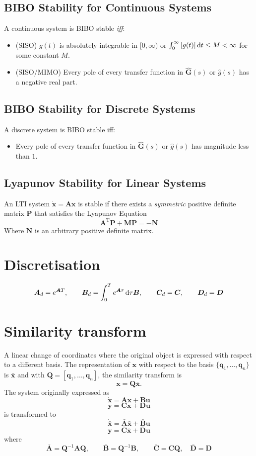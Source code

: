 \documentclass[a4paper]{article}
\newcommand{\M}[1]{\bm{#1}}
\newcommand{\V}[1]{\mathbf{#1}}
\newcommand{\transpose}{^{\text{T}}}
\begin{document}
\subsection{BIBO Stability for Continuous Systems}
A continuous system is BIBO stable \emph{iff}:
\begin{itemize}
\item	(SISO) $g(t)$ is absolutely integrable in $[0, \infty)$ \quad or \quad $\int_{0}^{\infty} |g(t)| \dif t \leq M < \infty $ for some constant $M$.
\item	(SISO/MIMO) Every pole of every transfer function in $\M{\hat{G}}(s)$ or $\hat{g}(s)$ has a negative real part.
\end{itemize}
\subsection{BIBO Stability for Discrete Systems}
A discrete system is BIBO stable iff:
\begin{itemize}
\item	Every pole of every transfer function in $\M{\hat{G}}(s)$ or $\hat{g}(s)$ has magnitude less than $1$.
\end{itemize}
\subsection{Lyapunov Stability for Linear Systems}
An LTI system $\V{\dot{x}} = \M{A}\V{x}$ is stable if there exists a \emph{symmetric} positive definite matrix $\M{P}$ that satisfies the Lyapunov Equation
$$\M{A} \transpose \M{P} + \M{MP} = - \M{N}$$
Where $\M{N}$ is an arbitrary positive definite matrix.



\section{Discretisation}
$$\M{A}_d = e^{\M{A}T},\qquad \M{B}_d = \int_0^T e^{\M{A}\tau} \dif \tau \M{B}, \qquad \M{C}_d = \M{C}, \qquad \M{D}_d = \M{D}$$



\section{Similarity transform}
A linear change of coordinates where the original object is expressed with respect to a different basis. The representation of $\V{x}$ with respect to the basis $\{ \V{q}_1, \dots, \V{q}_n \}$ is $\V{\bar{x}}$ and with $\M{Q} = [ \V{q}_1, \dots, \V{q}_n ]$, the similarity transform is
$$\V{x} = \M{Q}\V{\bar{x}}.$$
The system originally expressed as
$$\V{\dot{x}} = \M{A}\V{x} + \M{B}\V{u}$$
$$\V{y} = \M{C}\V{x} + \M{D}\V{u}$$
is transformed to
$$\V{\dot{\bar{x}}} = \M{\bar{A}}\V{\bar{x}} + \M{\bar{B}}\V{u}$$
$$\V{y} = \M{\bar{C}}\V{\bar{x}} + \M{\bar{D}}\V{u}$$
where
$$\M{\bar{A}} = \M{Q}^{-1}\M{AQ},\qquad \M{\bar{B}} = \M{Q}^{-1}\M{B},\qquad \M{\bar{C}} = \M{CQ},\quad \M{\bar{D}} = \M{D}$$
\end{document}
